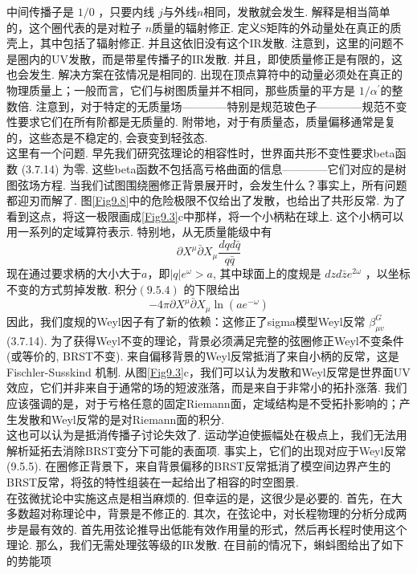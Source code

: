 中间传播子是 $1 / 0 $ ，只要内线 $j$与外线$n$相同，发散就会发生. 解释是相当简单的，这个圈代表的是对粒子 $n $质量的辐射修正. 定义S矩阵的外动量处在真正的质壳上，其中包括了辐射修正. 并且这依旧没有这个IR发散. 注意到，这里的问题不是圈内的UV发散，而是带星传播子的IR发散. 并且，即使质量修正是有限的，这也会发生. 解决方案在弦情况是相同的. 出现在顶点算符中的动量必须处在真正的物理质量上；一般而言，它们与树图质量并不相同，那些质量的平方是 $1 / \alpha^{\prime}$的整数倍. 注意到，对于特定的无质量场————特别是规范玻色子————规范不变性要求它们在所有阶都是无质量的. 附带地，对于有质量态，质量偏移通常是复的，这些态是不稳定的, 会衰变到轻弦态.\\
这里有一个问题. 早先我们研究弦理论的相容性时，世界面共形不变性要求beta函数 (3.7.14) 为零. 这些beta函数不包括高亏格曲面的信息————它们对应的是树图弦场方程. 当我们试图围绕圈修正背景展开时，会发生什么？事实上，所有问题都迎刃而解了. 图\ref{Fig9.8}中的危险极限不仅给出了发散，也给出了共形反常. 为了看到这点，将这一极限画成\ref{Fig9.3}c中那样，将一个小柄粘在球上. 这个小柄可以用一系列的定域算符表示. 特别地，从无质量能级中有
\begin{equation}
	\partial X^{\mu} \bar{\partial} X_{\mu} \frac{d q d \bar{q}}{q \bar{q}}
\end{equation}
现在通过要求柄的大小大于$a$，即$|q| e^{\omega}>a$, 其中球面上的度规是 $d z d \bar{z} e^{2 \omega} $ ，以坐标不变的方式剪掉发散. 积分$(9.5 .4)$ 的下限给出
\begin{equation}
	-4 \pi \partial X^{\mu} \bar{\partial} X_{\mu} \ln \left(a e^{-\omega}\right)
\end{equation}
因此，我们度规的Weyl因子有了新的依赖：这修正了sigma模型Weyl反常 $\beta_{\mu v}^{G}$ (3.7.14). 为了获得Weyl不变的理论，背景必须满足完整的弦圈修正Weyl不变条件 (或等价的, BRST不变). 来自偏移背景的Weyl反常抵消了来自小柄的反常，这是Fischler-Susskind 机制. 从图\ref{Fig9.3}c，我们可以认为发散和Weyl反常是世界面UV效应，它们并非来自于通常的场的短波涨落，而是来自于非常小的拓扑涨落. 我们应该强调的是，对于亏格任意的固定Riemann面，定域结构是不受拓扑影响的；产生发散和Weyl反常的是对Riemann面的积分. \\
这也可以认为是抵消传播子讨论失效了. 运动学迫使振幅处在极点上，我们无法用解析延拓去消除BRST变分下可能的表面项. 事实上，它们的出现对应于Weyl反常(9.5.5). 在圈修正背景下，来自背景偏移的BRST反常抵消了模空间边界产生的BRST反常，将弦的特性组装在一起给出了相容的时空图景.\\
在弦微扰论中实施这点是相当麻烦的. 但幸运的是，这很少是必要的. 首先，在大多数超对称理论中，背景是不修正的. 其次，在弦论中，对长程物理的分析分成两步是最有效的. 首先用弦论推导出低能有效作用量的形式，然后再长程时使用这个理论. 那么，我们无需处理弦等级的IR发散. 在目前的情况下，蝌蚪图给出了如下的势能项
